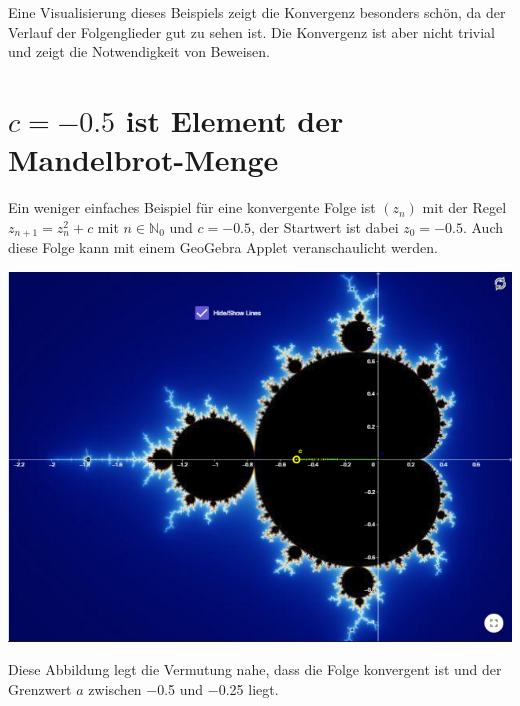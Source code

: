 \documentclass[a4paper, 12pt]{book}
\begin{document}
Eine Visualisierung dieses Beispiels zeigt die Konvergenz besonders
schön, da der Verlauf der Folgenglieder gut zu sehen ist. Die Konvergenz
ist aber nicht trivial und zeigt die Notwendigkeit von Beweisen.

\section{$c=-0.5$ ist Element der Mandelbrot-Menge}

Ein weniger einfaches Beispiel für eine konvergente Folge ist
\(\left( z_{n} \right)\) mit der Regel \(z_{n + 1} = z_{n}^{2} + c\) mit
\(n \in \mathbb{N}_{0}\) und \(c =  - 0.5\), der Startwert ist dabei
\(z_{0} =  - 0.5\). Auch diese Folge kann mit einem GeoGebra Applet
veranschaulicht werden.

\includegraphics[width=\linewidth]{image12.png}


Diese Abbildung legt die Vermutung nahe, dass die Folge konvergent ist
und der Grenzwert \(a\) zwischen \(-\)0.5 und \(-\)0.25 liegt.
\end{document}
